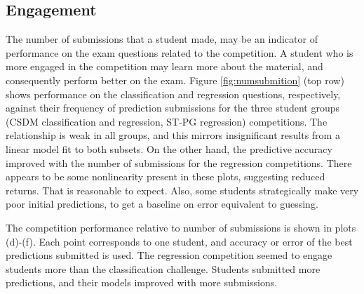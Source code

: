 \documentclass[12pt]{article}
\begin{document}
\subsection{Engagement}\label{engagement-1}

The number of submissions that a student made, may be an indicator of
performance on the exam questions related to the competition. A student
who is more engaged in the competition may learn more about the
material, and consequently perform better on the exam. Figure
\ref{fig:numsubmition} (top row) shows performance on the classification
and regression questions, respectively, against their frequency of
prediction submissions for the three student groups (CSDM classification
and regression, ST-PG regression) competitions. The relationship is weak
in all groups, and this mirrors insignificant results from a linear
model fit to both subsets. On the other hand, the predictive accuracy
improved with the number of submissions for the regression competitions.
There appears to be some nonlinearity present in these plots, suggesting
reduced returns. That is reasonable to expect. Also, some students
strategically make very poor initial predictions, to get a baseline on
error equivalent to guessing.

The competition performance relative to number of submissions is shown
in plots (d)-(f). Each point corresponds to one student, and accuracy or
error of the best predictions submitted is used. The regression
competition seemed to engage students more than the classification
challenge. Students submitted more predictions, and their models
improved with more submissions.
\end{document}
